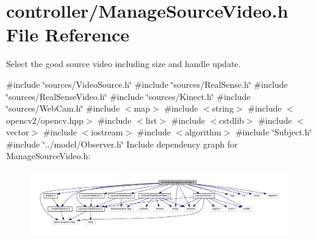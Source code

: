 \section{controller/\+Manage\+Source\+Video.h File Reference}
\label{_manage_source_video_8h}


Select the good source video including size and handle update.  


{\ttfamily \#include \char`\"{}sources/\+Video\+Source.\+h\char`\"{}}\newline
{\ttfamily \#include \char`\"{}sources/\+Real\+Sense.\+h\char`\"{}}\newline
{\ttfamily \#include \char`\"{}sources/\+Real\+Sense\+Video.\+h\char`\"{}}\newline
{\ttfamily \#include \char`\"{}sources/\+Kinect.\+h\char`\"{}}\newline
{\ttfamily \#include \char`\"{}sources/\+Web\+Cam.\+h\char`\"{}}\newline
{\ttfamily \#include $<$map$>$}\newline
{\ttfamily \#include $<$string$>$}\newline
{\ttfamily \#include $<$opencv2/opencv.\+hpp$>$}\newline
{\ttfamily \#include $<$list$>$}\newline
{\ttfamily \#include $<$cstdlib$>$}\newline
{\ttfamily \#include $<$vector$>$}\newline
{\ttfamily \#include $<$iostream$>$}\newline
{\ttfamily \#include $<$algorithm$>$}\newline
{\ttfamily \#include \char`\"{}Subject.\+h\char`\"{}}\newline
{\ttfamily \#include \char`\"{}../model/\+Observer.\+h\char`\"{}}\newline
Include dependency graph for Manage\+Source\+Video.\+h\+:
\nopagebreak
\begin{figure}[H]
\begin{center}
\leavevmode
\includegraphics[width=350pt]{_manage_source_video_8h__incl}
\end{center}
\end{figure}
